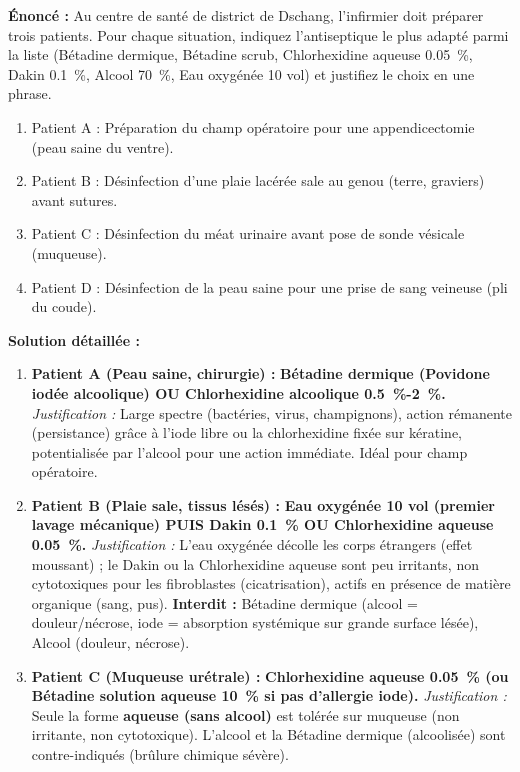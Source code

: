 \documentclass[11pt]{article}
\begin{document}
\begin{exoresolu}
    \textbf{Énoncé :} Au centre de santé de district de Dschang, l'infirmier doit préparer trois patients. Pour chaque situation, indiquez l'antiseptique le plus adapté parmi la liste (Bétadine dermique, Bétadine scrub, Chlorhexidine aqueuse \SI{0,05}{\percent}, Dakin \SI{0,1}{\percent}, Alcool \SI{70}{\percent}, Eau oxygénée 10 vol) et justifiez le choix en une phrase.
    \begin{enumerate}
        \item Patient A : Préparation du champ opératoire pour une appendicectomie (peau saine du ventre).
        \item Patient B : Désinfection d'une plaie lacérée sale au genou (terre, graviers) avant sutures.
        \item Patient C : Désinfection du méat urinaire avant pose de sonde vésicale (muqueuse).
        \item Patient D : Désinfection de la peau saine pour une prise de sang veineuse (pli du coude).
    \end{enumerate}
    \tcblower
    \textbf{Solution détaillée :}
    \begin{enumerate}
        \item \textbf{Patient A (Peau saine, chirurgie) :} \textbf{Bétadine dermique (Povidone iodée alcoolique) OU Chlorhexidine alcoolique \SI{0,5}{\percent}-\SI{2}{\percent}.} \textit{Justification :} Large spectre (bactéries, virus, champignons), action rémanente (persistance) grâce à l'iode libre ou la chlorhexidine fixée sur kératine, potentialisée par l'alcool pour une action immédiate. Idéal pour champ opératoire.
        \item \textbf{Patient B (Plaie sale, tissus lésés) :} \textbf{Eau oxygénée 10 vol (premier lavage mécanique) PUIS Dakin \SI{0,1}{\percent} OU Chlorhexidine aqueuse \SI{0,05}{\percent}.} \textit{Justification :} L'eau oxygénée décolle les corps étrangers (effet moussant) ; le Dakin ou la Chlorhexidine aqueuse sont peu irritants, non cytotoxiques pour les fibroblastes (cicatrisation), actifs en présence de matière organique (sang, pus). \textbf{Interdit :} Bétadine dermique (alcool = douleur/nécrose, iode = absorption systémique sur grande surface lésée), Alcool (douleur, nécrose).
        \item \textbf{Patient C (Muqueuse urétrale) :} \textbf{Chlorhexidine aqueuse \SI{0,05}{\percent} (ou Bétadine solution aqueuse \SI{10}{\percent} si pas d'allergie iode).} \textit{Justification :} Seule la forme \textbf{aqueuse (sans alcool)} est tolérée sur muqueuse (non irritante, non cytotoxique). L'alcool et la Bétadine dermique (alcoolisée) sont contre-indiqués (brûlure chimique sévère).

\end{enumerate}
\end{exoresolu}
\end{document}
